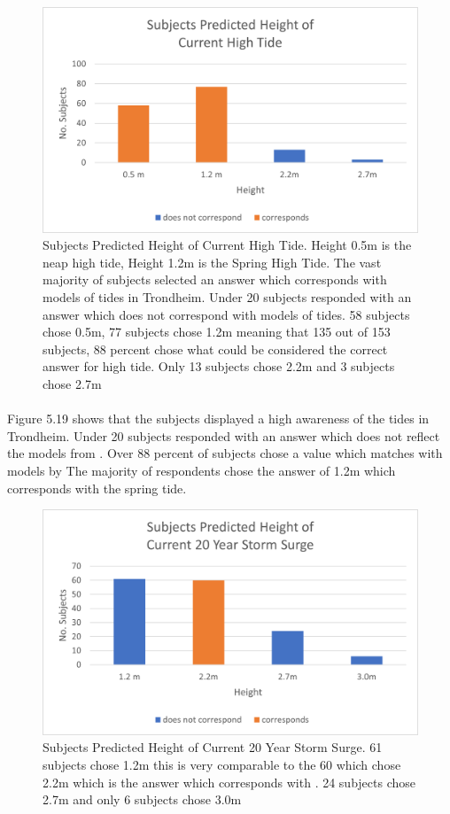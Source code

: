 \begin{figure}[H]
    \centering
    \includegraphics{fig_results/2022-hightide-answers.png}
    \caption{Subjects Predicted Height of Current High Tide. Height 0.5m is the neap high tide, Height 1.2m is the Spring High Tide. The vast majority of subjects selected an answer which corresponds with models of tides in Trondheim. Under 20 subjects responded with an answer which does not correspond with models of tides. 58 subjects chose 0.5m, 77 subjects chose 1.2m meaning that 135 out of 153 subjects, 88 percent chose what could be considered the correct answer for high tide. Only 13 subjects chose 2.2m and 3 subjects chose 2.7m}
    \label{fig:high-tide-answer}
\end{figure}
\paragraph{}
 Figure 5.19 shows that the subjects displayed a high awareness of the tides in Trondheim. Under 20 subjects responded with an answer which does not reflect the models from \cite{kartverket_se_2021}. Over 88 percent of subjects chose a value which matches with models by \cite{kartverket_se_2021} The majority of respondents chose the answer of 1.2m which corresponds with the spring tide. 

\begin{figure}[H]
    \centering
    \includegraphics{fig_results/2022-20yrss-answer.png}
    \caption{Subjects Predicted Height of Current 20 Year Storm Surge. 61 subjects chose 1.2m this is very comparable to the 60 which chose 2.2m which is the answer which corresponds with \cite{kartverket_se_2021}. 24 subjects chose 2.7m and only 6 subjects chose 3.0m}
    \label{fig:2022-stormsurge-answers}
\end{figure}
